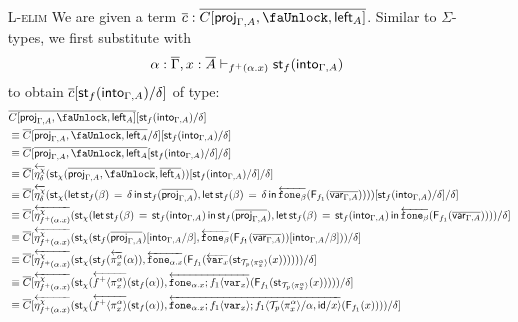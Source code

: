 \documentclass[10pt]{article}
\theoremstyle{definition}
\newcommand{\yields}{\vdash}
\newcommand{\id}{\mathsf{id}}
\newcommand{\rewrite}[2]{\overleftarrow{#1}(#2)}
\newcommand\StI[2]{\ensuremath{\mathsf{st}_{#1}(#2)}}
\newcommand\StE[4]{\ensuremath{\mathsf{let} \, \StI{#1}{#3} \, = \, {#2} \, \mathsf{in} \, #4}}
\newcommand\FIs[2]{\ensuremath{\mathsf{F}_{#1}{(#2)}}}
\newcommand\TrPlus[2]{\ensuremath{{#1}^+(#2)}}
\newcommand\ApEl[2]{\mathcal{T}_{#1}\langle#2\rangle}
\newcommand\ap[2]{\ensuremath{#1 \langle #2 \rangle }}
\newcommand\ApPlus[2]{\ensuremath{{#1}^+ \langle #2 \rangle }}
\begin{document}
\begin{enumerate}
\item[\textsc{L-elim}] We are given a term $\upstairs{c} : \upstairs{C[\proj{\Gamma, A}, \lock, \LI{A}]}$. Similar to $\Sigma$-types, we first substitute with
\begin{align*}
\alpha : \upstairs{\Gamma}, x : \upstairs{A} \yields_{\TrPlus{f}{\alpha.x}} \StI{f}{\into{\Gamma, A}}
\end{align*}
to obtain $\upstairs{c}[\StI{f}{\into{\Gamma, A}}/\delta]$ of type:
\begin{align*}
&\upstairs{C[\proj{\Gamma, A}, \lock, \LI{A}]}[\StI{f}{\into{\Gamma, A}}/\delta] \\
&\equiv \upstairs{C}[\upstairs{\proj{\Gamma, A}, \lock, \LI{A}}/\delta][\StI{f}{\into{\Gamma, A}}/\delta] \\
&\equiv \upstairs{C}[\upstairs{\proj{\Gamma, A}, \lock, \LI{A}}[\StI{f}{\into{\Gamma, A}}/\delta]/\delta] \\
&\equiv \upstairs{C}[\rewrite{\eta^\chi_\delta}{\StI{\chi}{\upstairs{\proj{\Gamma, A}, \lock}, \upstairs{\LI{A}}}}[\StI{f}{\into{\Gamma, A}}/\delta]/\delta] \\
&\equiv \upstairs{C}[\rewrite{\eta^\chi_\delta}{\StI{\chi}{\StE{f}{\delta}{\beta}{\StI{f}{\upstairs{\proj{\Gamma, A}}}}, \StE{f}{\delta}{\beta}{\rewrite{\fone{\beta}}{\FIs{f_1}{\upstairs{\qvar{\Gamma, A}}}}}}}[\StI{f}{\into{\Gamma, A}}/\delta]/\delta] \\
&\equiv \upstairs{C}[\rewrite{\eta^\chi_{\TrPlus{f}{\alpha.x}}}{\StI{\chi}{\StE{f}{\StI{f}{\into{\Gamma, A}}}{\beta}{\StI{f}{\upstairs{\proj{\Gamma, A}}}}, \StE{f}{\StI{f}{\into{\Gamma, A}}}{\beta}{\rewrite{\fone{\beta}}{\FIs{f_1}{\upstairs{\qvar{\Gamma, A}}}}}}}/\delta] \\
&\equiv \upstairs{C}[\rewrite{\eta^\chi_{\TrPlus{f}{\alpha.x}}}{\StI{\chi}{\StI{f}{\upstairs{\proj{\Gamma, A}}}[\into{\Gamma, A}/\beta], \rewrite{\fone{\beta}}{\FIs{f_1}{\upstairs{\qvar{\Gamma, A}}}}[\into{\Gamma, A}/\beta]}}/\delta] \\
&\equiv \upstairs{C}[\rewrite{\eta^\chi_{\TrPlus{f}{\alpha.x}}}{\StI{\chi}{\StI{f}{\rewrite{\pi^\alpha_x}{\alpha}}, \rewrite{\fone{\alpha.x}}{\FIs{f_1}{\rewrite{\var{x}}{\StI{\ApEl{p}{\pi^\alpha_x}}{x}}}}}}/\delta] \\
&\equiv \upstairs{C}[\rewrite{\eta^\chi_{\TrPlus{f}{\alpha.x}}}{\StI{\chi}{\rewrite{\ApPlus{f}{\pi^\alpha_x}}{\StI{f}{\alpha}}, \rewrite{\fone{\alpha.x};\ap{f_1}{\var{x}}}{\FIs{f_1}{\StI{\ApEl{p}{\pi^\alpha_x}}{x}}}}}/\delta] \\
&\equiv \upstairs{C}[\rewrite{\eta^\chi_{\TrPlus{f}{\alpha.x}}}{\StI{\chi}{\rewrite{\ApPlus{f}{\pi^\alpha_x}}{\StI{f}{\alpha}}, \rewrite{\fone{\alpha.x};\ap{f_1}{\var{x}};\ap{f_1}{\ApEl{p}{\pi^\alpha_x}/\alpha, \id / x}}{\FIs{f_1}{x}}}}/\delta] \\

\end{align*}
\end{enumerate}
\end{document}
